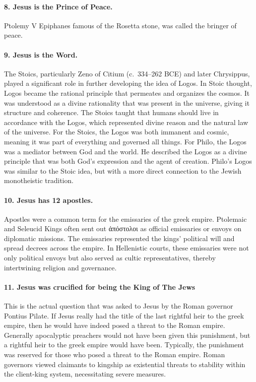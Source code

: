 \paragraph{8.
Jesus is the Prince of Peace.}\label{par:jesus-is-the-prince-of-peace.}

Ptolemy V Epiphanes famous of the Rosetta stone, was called the bringer of peace.
\paragraph{9.
Jesus is the Word.}\label{par:jesus-is-the-word.}
The Stoics, particularly Zeno of Citium (c.~334–262 BCE) and later Chrysippus, played a significant role in further developing the idea of Logos.
In Stoic thought, Logos became the rational principle that permeates and organizes the cosmos.
It was understood as a divine rationality that was present in the universe, giving it structure and coherence.
The Stoics taught that humans should live in accordance with the Logos, which represented divine reason and the natural law of the universe.
For the Stoics, the Logos was both immanent and cosmic, meaning it was part of everything and governed all things.
For Philo, the Logos was a mediator between God and the world.
He described the Logos as a divine principle that was both God’s expression and the agent of creation.
Philo’s Logos was similar to the Stoic idea, but with a more direct connection to the Jewish monotheistic tradition.
\paragraph{10.
Jesus has 12 apostles.}\label{par:jesus-has-12-apostles.}
Apostles were a common term for the emissaries of the greek empire.
Ptolemaic and Seleucid Kings often sent out ἀπόστολοι as official emissaries or envoys on diplomatic missions.
The emissaries represented the kings’ political will and spread decrees across the empire.
In Hellenistic courts, these emissaries were not only political envoys but also served as cultic representatives, thereby intertwining religion and governance.
\paragraph{11.
Jesus was crucified for being the King of The Jews}\label{par:jesus-was-crucified-for-being-the-king-of-the-jews}
This is the actual question that was asked to Jesus by the Roman governor Pontius Pilate.
If Jesus really had the title of the last rightful heir to the greek empire, then he would have indeed posed a threat to the Roman empire.
Generally apocalyptic preachers would not have been given this punishment, but a rightful heir to the greek empire would have been.
Typically, the punishment was reserved for those who posed a threat to the Roman empire.
Roman governors viewed claimants to kingship as existential threats to stability within the client-king system, necessitating severe measures.
